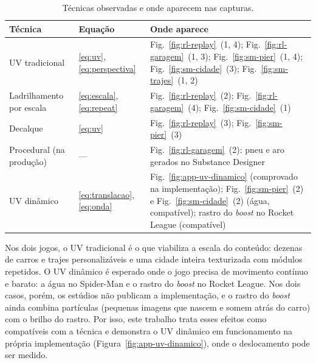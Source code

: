 \begin{table}[H]
\centering
\caption{Técnicas observadas e onde aparecem nas capturas.}
\label{tab:marcacoes}
\small
\begin{tabular}{p{3.6cm}p{2.6cm}p{7.6cm}}
\toprule
\textbf{Técnica} & \textbf{Equação} & \textbf{Onde aparece} \\
\midrule
UV tradicional & \eqref{eq:uv}, \eqref{eq:perspectiva} & Fig.~\ref{fig:rl-replay}~(1, 4); Fig.~\ref{fig:rl-garagem}~(1, 3); Fig.~\ref{fig:sm-pier}~(1, 4); Fig.~\ref{fig:sm-cidade}~(3); Fig.~\ref{fig:sm-trajes}~(1, 2) \\
Ladrilhamento por escala & \eqref{eq:escala}, \eqref{eq:repeat} & Fig.~\ref{fig:rl-replay}~(2); Fig.~\ref{fig:rl-garagem}~(4); Fig.~\ref{fig:sm-cidade}~(1) \\
Decalque & \eqref{eq:uv} & Fig.~\ref{fig:rl-replay}~(3); Fig.~\ref{fig:sm-pier}~(3) \\
Procedural (na produção) & --- & Fig.~\ref{fig:rl-garagem}~(2): pneu e aro gerados no Substance Designer \cite{substance} \\
UV dinâmico & \eqref{eq:translacao}, \eqref{eq:onda} & Fig.~\ref{fig:app-uv-dinamico} (comprovado na implementação); Fig.~\ref{fig:sm-pier}~(2) e Fig.~\ref{fig:sm-cidade}~(2) (água, compatível); rastro do \textit{boost} no Rocket League (compatível) \\
\bottomrule
\end{tabular}
\end{table}

Nos dois jogos, o UV tradicional é o que viabiliza a escala do conteúdo: dezenas de carros e trajes personalizáveis e uma cidade inteira texturizada com módulos repetidos. O UV dinâmico é esperado onde o jogo precisa de movimento contínuo e barato: a água no Spider-Man e o rastro do \textit{boost} no Rocket League. Nos dois casos, porém, os estúdios não publicam a implementação, e o rastro do \textit{boost} ainda combina partículas (pequenas imagens que nascem e somem atrás do carro) com o brilho do rastro. Por isso, este trabalho trata esses efeitos como compatíveis com a técnica e demonstra o UV dinâmico em funcionamento na própria implementação (Figura~\ref{fig:app-uv-dinamico}), onde o deslocamento pode ser medido.
